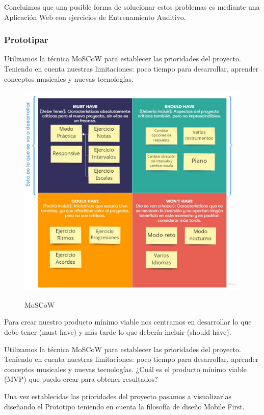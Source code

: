 \documentclass[12pt,twoside,titlepage]{report}
\begin{document}
Concluimos que una posible forma de solucionar estos problemas es mediante una Aplicación Web con ejercicios de Entrenamiento Auditivo. 


\subsubsection{Prototipar}

Utilizamos la técnica MoSCoW para establecer las prioridades del proyecto. Teniendo en cuenta nuestras limitaciones: poco tiempo para desarrollar, aprender conceptos musicales y nuevas tecnologías. 

\begin{figure}[H]
    \centering
    \includegraphics[scale=0.35]{MOSCOW}
    \label{fig:MoSCoW}
    \caption{MoSCoW}
\end{figure}

Para crear nuestro producto mínimo viable nos centramos en desarrollar lo que debe tener (must have) y más tarde lo que debería incluir (should have).

Utilizamos la técnica MoSCoW para establecer las prioridades del proyecto. Teniendo en cuenta nuestras limitaciones: poco tiempo para desarrollar, aprender conceptos musicales y nuevas tecnologías. ¿Cuál es el producto mínimo viable (MVP) que puedo crear para obtener resultados?

Una vez establecidas las prioridades del proyecto pasamos a visualizarlas diseñando el Prototipo teniendo en cuenta la filosofía de diseño Mobile First.
\end{document}
